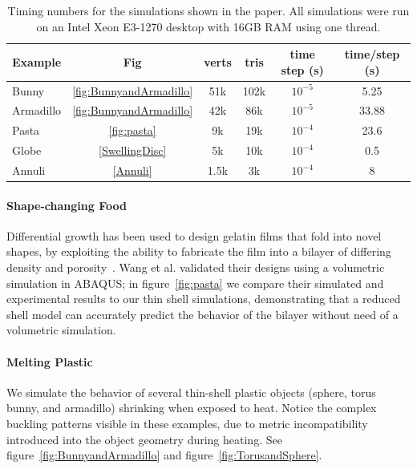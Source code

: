 \documentclass[timestamp,acmtog]{acmart}
\begin{document}
\begin{table}[htb]
\begin{tabular}{lc|cc|cc}
Example & Fig & verts & tris & time step (s) & time/step (s) \\
\hline
Bunny & \ref{fig:BunnyandArmadillo} & 51k & 102k & $10^{-5}$ & 5.25  \\
Armadillo & \ref{fig:BunnyandArmadillo} & 42k & 86k &  $10^{-5}$ & 33.88 \\
Pasta & \ref{fig:pasta} & 9k & 19k & $10^{-4}$ &  23.6 \\
Globe & \ref{SwellingDisc} & 5k & 10k & $10^{-4}$ & 0.5 \\
Annuli  & \ref{Annuli} & 1.5k & 3k & $10^{-4}$ & 8 
\end{tabular}
\caption{Timing numbers for the simulations shown in the paper. All simulations were run on an Intel Xeon E3-1270 desktop with 16GB RAM using one thread.}
\label{tab:timing}
\end{table}


\paragraph{Shape-changing Food} Differential growth has been used to design gelatin films that fold into novel shapes, by exploiting the ability to fabricate the film into a bilayer of differing density and porosity~\cite{Wang2017}. Wang et al. validated their designs using a volumetric simulation in ABAQUS; in figure~\ref{fig:pasta} we compare their simulated and experimental results to our thin shell simulations, demonstrating that a reduced shell model can accurately predict the behavior of the bilayer without need of a volumetric simulation.

\paragraph{Melting Plastic} We simulate the behavior of several thin-shell plastic objects (sphere, torus bunny, and armadillo) shrinking when exposed to heat. Notice the complex buckling patterns visible in these examples, due to metric incompatibility introduced into the object geometry during heating. See figure~\ref{fig:BunnyandArmadillo} and figure~\ref{fig:TorusandSphere}.
\end{document}
